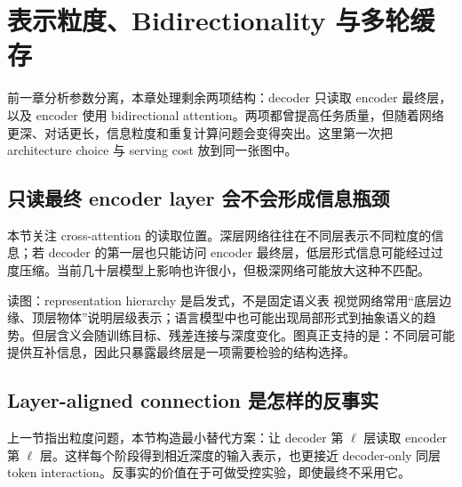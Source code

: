 \section{表示粒度、Bidirectionality 与多轮缓存}

前一章分析参数分离，本章处理剩余两项结构：decoder 只读取 encoder 最终层，以及 encoder 使用 bidirectional attention。两项都曾提高任务质量，但随着网络更深、对话更长，信息粒度和重复计算问题会变得突出。这里第一次把 architecture choice 与 serving cost 放到同一张图中。

\subsection{只读最终 encoder layer 会不会形成信息瓶颈}

本节关注 cross-attention 的读取位置。深层网络往往在不同层表示不同粒度的信息；若 decoder 的第一层也只能访问 encoder 最终层，低层形式信息可能经过过度压缩。当前几十层模型上影响也许很小，但极深网络可能放大这种不匹配。




\begin{knowledgebox}{读图：representation hierarchy 是启发式，不是固定语义表}
视觉网络常用“底层边缘、顶层物体”说明层级表示；语言模型中也可能出现局部形式到抽象语义的趋势。但层含义会随训练目标、残差连接与深度变化。图真正支持的是：不同层可能提供互补信息，因此只暴露最终层是一项需要检验的结构选择。
\end{knowledgebox}


\subsection{Layer-aligned connection 是怎样的反事实}

上一节指出粒度问题，本节构造最小替代方案：让 decoder 第 $\ell$ 层读取 encoder 第 $\ell$ 层。这样每个阶段得到相近深度的输入表示，也更接近 decoder-only 同层 token interaction。反事实的价值在于可做受控实验，即使最终不采用它。


